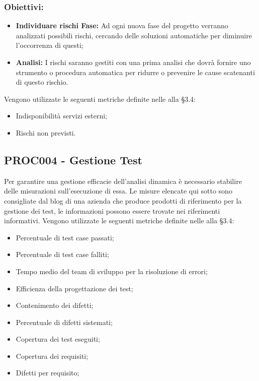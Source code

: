 \documentclass[PianoDiQualifica.tex]{subfiles}
\begin{document}
\subsubsection{Obiettivi:}
\begin{itemize}
	\item \textbf{Individuare rischi Fase:} Ad ogni nuova fase del progetto verranno analizzati possibili rischi, cercando delle soluzioni automatiche per diminuire l'occorrenza di questi;
	\item \textbf{Analisi:} I rischi saranno gestiti con una prima analisi che dovrà fornire uno strumento o procedura automatica per ridurre o prevenire le cause scatenanti di questo rischio.
\end{itemize}
Vengono utilizzate le seguenti metriche definite nelle \ndp alla \S{3.4}:
\begin{itemize}
	\item {} Indisponibilità servizi esterni;
	\item {} Rischi non previsti.
\end{itemize}

\subsection{PROC004 - Gestione Test}	
Per garantire una gestione efficacie dell'analisi dinamica è necessario stabilire delle misurazioni sull'esecuzione di essa.
Le misure elencate qui sotto sono consigliate dal blog di una azienda che produce prodotti di riferimento per la gestione dei test, le informazioni possono essere trovate nei riferimenti informativi.
Vengono utilizzate le seguenti metriche definite nelle \ndp alla \S{3.4}:
\begin{itemize}
	\item {} Percentuale di test case passati;
	\item {} Percentuale di test case falliti;
	\item {} Tempo medio del team di sviluppo per la risoluzione di errori;
	\item {} Efficienza della progettazione dei test;
	\item {} Contenimento dei difetti;
	\item {} Percentuale di difetti sistemati;
	\item {} Copertura dei test eseguiti;
	\item {} Copertura dei requisiti;
	\item {} Difetti per requisito;	
\end{itemize}
\end{document}
